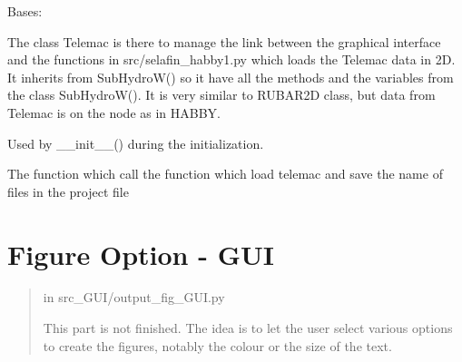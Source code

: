 \documentclass[letterpaper,10pt,english]{sphinxmanual}
\begin{document}
\begin{fulllineitems}
\label{\detokenize{index:src_GUI.hydro_GUI_2.TELEMAC}}
Bases: {\hyperref[\detokenize{index:src_GUI.hydro_GUI_2.SubHydroW}]{}}

The class Telemac is there to manage the link between the graphical interface and the functions in src/selafin\_habby1.py
which loads the Telemac data in 2D. It inherits from SubHydroW() so it have all the methods and the variables
from the class SubHydroW(). It is very similar to RUBAR2D class, but data from Telemac is on the node as in HABBY.

\begin{fulllineitems}
\label{\detokenize{index:src_GUI.hydro_GUI_2.TELEMAC.init_iu}}
Used by \_\_init\_\_() during the initialization.

\end{fulllineitems}


\begin{fulllineitems}
\label{\detokenize{index:src_GUI.hydro_GUI_2.TELEMAC.load_telemac_gui}}
The function which call the function which load telemac and save the name of files in the project file

\end{fulllineitems}


\end{fulllineitems}



\section{Figure Option - GUI}
\label{\detokenize{index:figure-option-gui}}\begin{quote}

in src\_GUI/output\_fig\_GUI.py

This part is not finished. The idea is to let the user select various options to create
the figures, notably the colour or the size of the text.
\end{quote}
\label{\detokenize{index:module-src_GUI.output_fig_GUI}}
\end{document}
